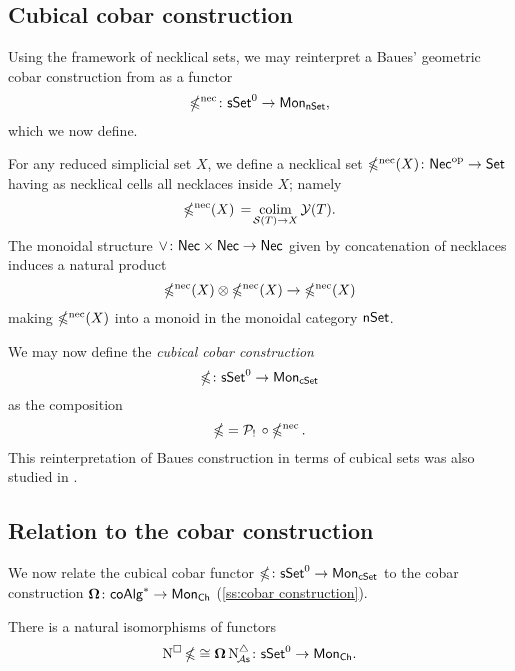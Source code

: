 \subsection{Cubical cobar construction}\label{ss:cubical cobar}

Using the framework of necklical sets, we may reinterpret a Baues' geometric cobar construction from \cite{baues1998hopf} as a functor
\[
\operatorname{\mathbb{\Omega}^{\mathrm{nec}}} \colon \mathsf{sSet}^0 \to \mathsf{Mon}_{\mathsf{nSet}},
\]
which we now define.

For any reduced simplicial set $X$, we define a necklical set $\operatorname{\mathbb{\Omega}^{\mathrm{nec}}}(X) \colon \mathsf{Nec}^{\mathrm{op}} \to \mathsf{Set}$ having as necklical cells all necklaces inside $X$; namely
\[
\operatorname{\mathbb{\Omega}^{\mathrm{nec}}}(X) \, = \! \operatorname*{colim}_{\mathcal{S}(T) \to X} \mathcal{Y}(T).
\]
The monoidal structure $\vee \colon \mathsf{Nec} \times \mathsf{Nec} \to \mathsf{Nec}$ given by concatenation of necklaces induces a natural product
\[
\operatorname{\mathbb{\Omega}^{\mathrm{nec}}}(X) \otimes \operatorname{\mathbb{\Omega}^{\mathrm{nec}}}(X) \to \operatorname{\mathbb{\Omega}^{\mathrm{nec}}}(X)
\]
making $\operatorname{\mathbb{\Omega}^{\mathrm{nec}}}(X)$ into a monoid in the monoidal category $\mathsf{nSet}$.

We may now define the \textit{cubical cobar construction}
\[
\operatorname{\mathbb{\Omega}} \colon \mathsf{sSet}^0 \to \mathsf{Mon}_{\mathsf{cSet}}
\]
as the composition
\[
\operatorname{\mathbb{\Omega}} = \mathcal{P}_! \, \circ \operatorname{\mathbb{\Omega}^{\mathrm{nec}}}.
\]
This reinterpretation of Baues construction in terms of cubical sets was also studied in \cite{rivera2018cubical}.

\subsection{Relation to the cobar construction}

We now relate the cubical cobar functor $\operatorname{\mathbb{\Omega}} \colon \mathsf{sSet}^0 \to \mathsf{Mon}_{\mathsf{cSet}}$ to the cobar construction $\operatorname{\mathbf{\Omega}} \colon \mathsf{coAlg}^\ast \to \mathsf{Mon}_{\mathsf{Ch}}$ (\cref{ss:cobar construction}).

\begin{theorem}\label{t:ccobar and cobar}
	There is a natural isomorphisms of functors
	\[
	\operatorname{N^{\square}} \operatorname{\mathbb{\Omega}} \cong \operatorname{\mathbf{\Omega}} \operatorname{N^{\triangle}_{\!{\mathcal{A}\mathsf{s}}}} \colon \mathsf{sSet}^0 \to \mathsf{Mon}_{\mathsf{Ch}}.
	\]
\end{theorem}

